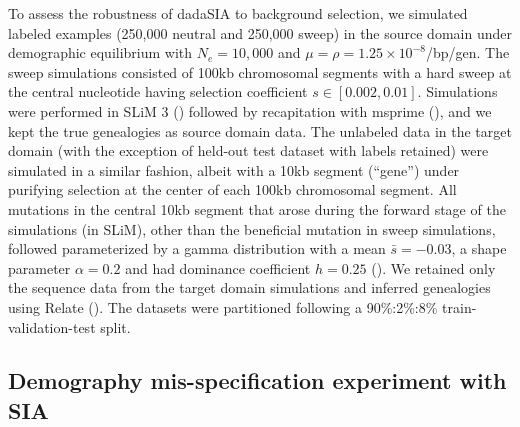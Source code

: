 To assess the robustness of \ac{dadaSIA} to background selection, we simulated labeled examples (250,000 neutral and 250,000 sweep) in the source domain under demographic equilibrium with $N_e = 10,000$ and $\mu = \rho = 1.25\times 10^{-8}$/bp/gen. The sweep simulations consisted of 100kb chromosomal segments with a hard sweep at the central nucleotide having selection coefficient $s \in [0.002, 0.01]$. Simulations were performed in SLiM 3 (\cite{haller_slim_2019,haller_tree-sequence_2019}) followed by recapitation with msprime (\cite{baumdicker_efficient_2022}), and we kept the true genealogies as source domain data. The unlabeled data in the target domain (with the exception of held-out test dataset with labels retained) were simulated in a similar fashion, albeit with a 10kb segment (“gene”) under purifying selection at the center of each 100kb chromosomal segment. All mutations in the central 10kb segment that arose during the forward stage of the simulations (in SLiM), other than the beneficial mutation in sweep simulations, followed  parameterized by a gamma distribution with a mean $\bar{s} = -0.03$, a shape parameter $\alpha = 0.2$ and had dominance coefficient $h=0.25$ (\cite{boyko_assessing_2008}). We retained only the sequence data from the target domain simulations and inferred genealogies using Relate (\cite{speidel_method_2019}). The datasets were partitioned following a 90\%:2\%:8\% train-validation-test split.

\subsection{Demography mis-specification experiment with \ac{SIA}}

